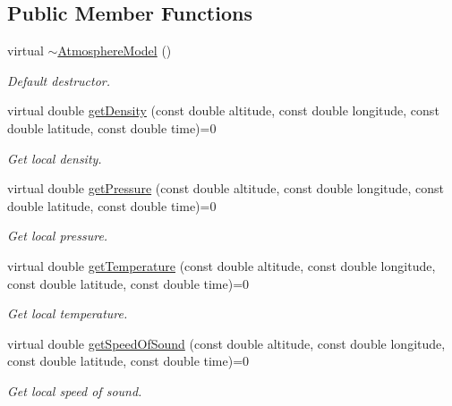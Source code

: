 \subsection*{Public Member Functions}
\begin{DoxyCompactItemize}
\item 
virtual \hyperlink{classtudat_1_1aerodynamics_1_1AtmosphereModel_a1ceb7bfb8c497ca6b6a0ccbade902ed7}{$\sim$\+Atmosphere\+Model} ()
\begin{DoxyCompactList}\small\item\em Default destructor. \end{DoxyCompactList}\item 
virtual double \hyperlink{classtudat_1_1aerodynamics_1_1AtmosphereModel_a167feb7925eb65a4ca59317d5fba22fb}{get\+Density} (const double altitude, const double longitude, const double latitude, const double time)=0
\begin{DoxyCompactList}\small\item\em Get local density. \end{DoxyCompactList}\item 
virtual double \hyperlink{classtudat_1_1aerodynamics_1_1AtmosphereModel_a516553ea32c89f55a5ba7abe5a417ddc}{get\+Pressure} (const double altitude, const double longitude, const double latitude, const double time)=0
\begin{DoxyCompactList}\small\item\em Get local pressure. \end{DoxyCompactList}\item 
virtual double \hyperlink{classtudat_1_1aerodynamics_1_1AtmosphereModel_a9b6be6472481354320e2869e586be5ca}{get\+Temperature} (const double altitude, const double longitude, const double latitude, const double time)=0
\begin{DoxyCompactList}\small\item\em Get local temperature. \end{DoxyCompactList}\item 
virtual double \hyperlink{classtudat_1_1aerodynamics_1_1AtmosphereModel_a815606ec0437866d6308679c6f078bce}{get\+Speed\+Of\+Sound} (const double altitude, const double longitude, const double latitude, const double time)=0
\begin{DoxyCompactList}\small\item\em Get local speed of sound. \end{DoxyCompactList}\end{DoxyCompactItemize}


